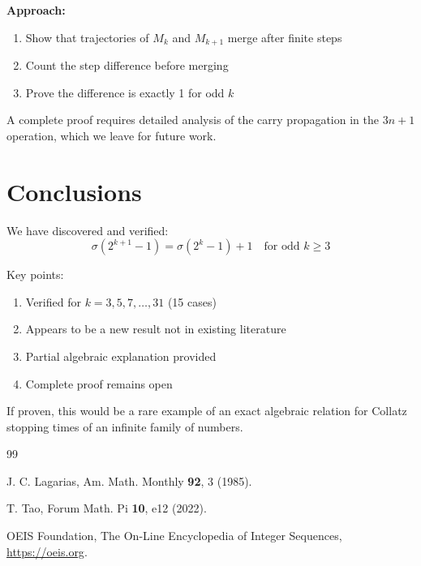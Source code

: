 \documentclass[twocolumn,prl,aps,superscriptaddress]{revtex4-2}
\begin{document}
\textbf{Approach:} 
\begin{enumerate}
\item Show that trajectories of $M_k$ and $M_{k+1}$ merge after finite steps
\item Count the step difference before merging
\item Prove the difference is exactly 1 for odd $k$
\end{enumerate}

A complete proof requires detailed analysis of the carry propagation 
in the $3n+1$ operation, which we leave for future work.

\section{Conclusions}

We have discovered and verified:
\begin{equation}
\sigma(2^{k+1} - 1) = \sigma(2^k - 1) + 1 \quad \text{for odd } k \geq 3
\end{equation}

Key points:
\begin{enumerate}
\item Verified for $k = 3, 5, 7, \ldots, 31$ (15 cases)
\item Appears to be a new result not in existing literature
\item Partial algebraic explanation provided
\item Complete proof remains open
\end{enumerate}

If proven, this would be a rare example of an exact algebraic relation 
for Collatz stopping times of an infinite family of numbers.

\begin{thebibliography}{99}

J. C. Lagarias, Am. Math. Monthly \textbf{92}, 3 (1985).

T. Tao, Forum Math. Pi \textbf{10}, e12 (2022).

OEIS Foundation, The On-Line Encyclopedia of Integer Sequences, 
\url{https://oeis.org}.

\end{thebibliography}
\end{document}

